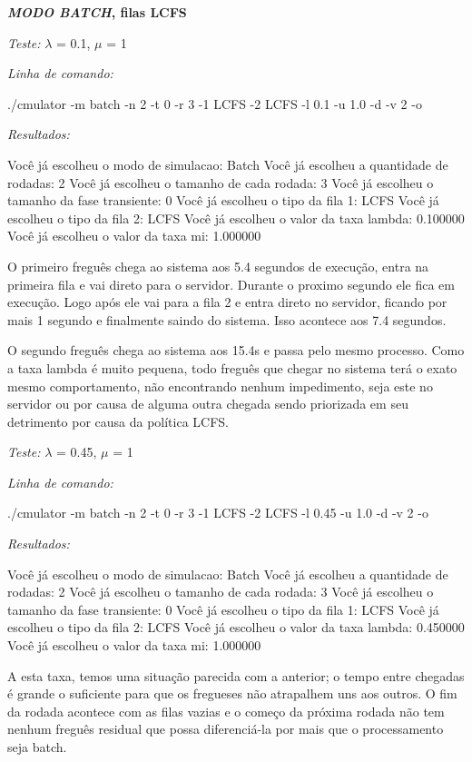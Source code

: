 \documentclass[a4paper,10pt]{article}
\begin{document}
\textbf{\emph{MODO BATCH}, filas LCFS}

\emph{Teste:} $\lambda$ = 0.1, $\mu$ = 1

\emph{Linha de comando:}

./cmulator -m batch -n 2 -t 0 -r 3 -1 LCFS -2 LCFS -l 0.1 -u 1.0 -d -v 2 -o

\emph{Resultados:}

Você já escolheu o modo de simulacao: Batch
Você já escolheu a quantidade de rodadas: 2
Você já escolheu o tamanho de cada rodada: 3
Você já escolheu o tamanho da fase transiente: 0
Você já escolheu o tipo da fila 1: LCFS
Você já escolheu o tipo da fila 2: LCFS
Você já escolheu o valor da taxa lambda: 0.100000
Você já escolheu o valor da taxa mi: 1.000000

    O primeiro freguês chega ao sistema aos 5.4 segundos de execução, entra na primeira fila e vai direto para o servidor. Durante o proximo segundo ele fica em execução. Logo após ele vai para a fila 2 e entra direto no servidor, ficando por mais 1 segundo e finalmente saindo do sistema. Isso acontece aos 7.4 segundos.

    O segundo freguês chega ao sistema aos 15.4s e passa pelo mesmo processo. Como a taxa lambda é muito pequena, todo freguês que chegar no sistema terá o exato mesmo comportamento, não encontrando nenhum impedimento, seja este no servidor ou por causa de alguma outra chegada sendo priorizada em seu detrimento por causa da política LCFS.

\emph{Teste:} $\lambda$ = 0.45, $\mu$ = 1

\emph{Linha de comando:}

./cmulator -m batch -n 2 -t 0 -r 3 -1 LCFS -2 LCFS -l 0.45 -u 1.0 -d -v 2 -o

\emph{Resultados:}

Você já escolheu o modo de simulacao: Batch
Você já escolheu a quantidade de rodadas: 2
Você já escolheu o tamanho de cada rodada: 3
Você já escolheu o tamanho da fase transiente: 0
Você já escolheu o tipo da fila 1: LCFS
Você já escolheu o tipo da fila 2: LCFS
Você já escolheu o valor da taxa lambda: 0.450000
Você já escolheu o valor da taxa mi: 1.000000

    A esta taxa, temos uma situação parecida com a anterior; o tempo entre chegadas é grande o suficiente para que os fregueses não atrapalhem uns aos outros. O fim da rodada acontece com as filas vazias e o começo da próxima rodada não tem nenhum freguês residual que possa diferenciá-la por mais que o processamento seja batch.
\end{document}

